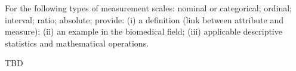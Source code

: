 \Exercise[number={1}]
For the following types of measurement scales: nominal or categorical;
ordinal; interval; ratio; absolute; provide:
(i) a definition (link between attribute and measure);
(ii) an example in the biomedical field;
(iii) applicable descriptive statistics and mathematical operations.

\Answer[number={1}]
TBD